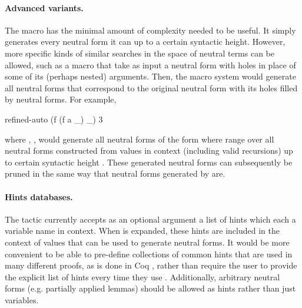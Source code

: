 \paragraph{Advanced  variants.}
The  macro has the minimal amount of complexity needed to be useful. It
simply generates every neutral form it can up to a certain syntactic height.
However, more specific kinds of similar searches in the space of neutral terms
can be allowed, such as a  macro that take as input a neutral
form with holes in place of some of its (perhaps nested) arguments. Then, the
macro system would generate all neutral forms that correspond to the original
neutral form with its holes filled by neutral forms. For example,
\begin{code}
  refined-auto (f (f a _) _) 3
\end{code}
where , ,
would generate all neutral forms of the form  where 
 range over all neutral forms constructed from values in context
(including valid recursions) up to certain syntactic height . These
generated neutral forms can subsequently be pruned in the same way that neutral
forms generated by  are.

\paragraph{Hints databases.}
The  tactic currently accepts as an optional argument a list of
hints which each a variable name in context. When  is expanded, these
hints are included in the context of values that can be used to generate neutral
forms. It would be more convenient to be able to pre-define collections of
common hints that are used in many different proofs, as is done in Coq
, rather than require the user to provide the explicit list of
hints every time they use . Additionally, arbitrary neutral forms (e.g.
partially applied lemmas) should be allowed as hints rather than just variables.


